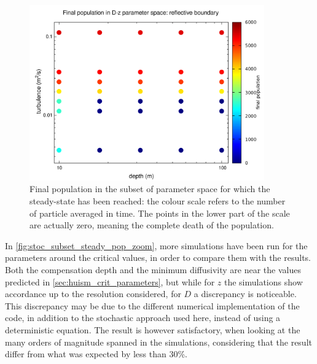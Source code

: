 \begin{figure} 
  \includegraphics[width=0.9\textwidth]{data/1D_model/reflective_bottom/bottom_right/bloom_pop}
  \caption{Final population in the subset of parameter space for which the steady-state has been reached: the colour scale refers to the number of particle averaged in time. The points in the lower part of the scale are actually zero, meaning the complete death of the population.}
    \label{fig:stoc_subset_steady_pop}
\end{figure}

In \autoref{fig:stoc_subset_steady_pop_zoom}, more simulations have been run for the parameters around the critical values, in order to compare them with the results. Both the compensation depth and the minimum diffusivity are near the values predicted in \autoref{sec:huism_crit_parameters}, but while for $z$ the simulations show accordance up to the resolution considered, for $D$ a discrepancy is noticeable. This discrepancy may be due to the different numerical implementation of the code, in addition to the stochastic approach used here, instead of using a deterministic equation. The result is however satisfactory, when looking at the many orders of magnitude spanned in the simulations, considering that the result differ from what was expected by less than 30\%.

